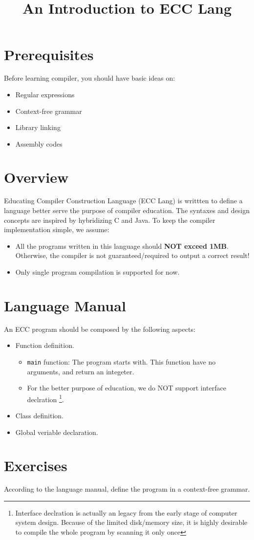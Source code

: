 \documentclass{article}
\title{An Introduction to ECC Lang}
\date{}
\begin{document}
\maketitle

\section{Prerequisites}

Before learning compiler, you should have basic ideas on:
\begin{itemize}
  \item Regular expressions
  \item Context-free grammar
  \item Library linking
  \item Assembly codes
\end{itemize}

\section{Overview}

Educating Compiler Construction Language (ECC Lang) is writtten to define
a language better serve the purpose of compiler education.
The syntaxes and design concepts are inspired by hybridizing C and Java.
To keep the compiler implementation simple, we assume:
\begin{itemize}
  \item All the programs written in this language should \textbf{NOT exceed 1MB}.
    Otherwise, the compiler is not guaranteed/required to output a correct result!
  \item Only single program compilation is supported for now.
\end{itemize}

\section{Language Manual}

An ECC program should be composed by the following aspects:

\begin{itemize}
  \item Function definition.
    \begin{itemize}
      \item \texttt{main} function: The program starts with. This function have no arguments, and return an integeter.
      \item For the better purpose of education, we do NOT support interface declration
	\footnote{Interface declration is actually an legacy from the early stage of computer system design. Because of the
	limited disk/memory size, it is highly desirable to compile the whole program by scanning it only once}.
    \end{itemize}
  \item Class definition.
  \item Global veriable declaration.
\end{itemize}

\section{Exercises}

According to the language manual, define the program in a context-free grammar.
\end{document}

